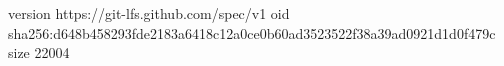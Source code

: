 version https://git-lfs.github.com/spec/v1
oid sha256:d648b458293fde2183a6418c12a0ce0b60ad3523522f38a39ad0921d1d0f479c
size 22004
